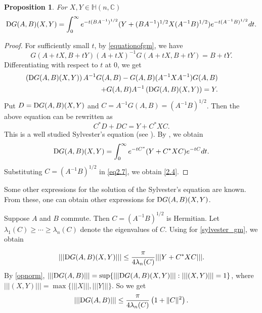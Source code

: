 \documentclass[12pt,epsfig,reqno]{amsart}
\newcommand{\C}{\mathbb{C}}
\newcommand{\De}{{\rm D}}
\newtheorem{prop}[thm]{Proposition}
\theoremstyle{remark}
\begin{document}
\begin{prop}\label{prop2.1}
For $X,Y\in \mathbb H(n,\C)$
\begin{equation}
\De G(A,B)(X,Y)=\int_0^{\infty} e^{-t (BA^{-1})^{1/2}} (Y+(BA^{-1})^{1/2} X (A^{-1} B)^{1/2}) e^{-t(A^{-1} B)^{1/2}} dt. \label{2.4}
\end{equation}
\end{prop}
\begin{proof}
 For sufficiently small $t$, by \eqref{equationofgm}, we have
\begin{equation}
G(A+tX,B+tY) (A+tX)^{-1} G(A+tX,B+tY)=B+tY.\label{2.1}
\end{equation}
Differentiating with respect to $t$  at $0$, we get
\begin{eqnarray*}
&&\hspace{-1.3cm}\left(\De G(A,B) (X,Y)\right) A^{-1} G(A,B)-G(A,B)(A^{-1}XA^{-1})G(A,B)\\
&&+G(A,B) A^{-1} \left(\De G(A,B)(X,Y)\right)=Y.
\end{eqnarray*}
Put $D=\De G(A,B)(X,Y)$ and $C=A^{-1} G(A,B)=(A^{-1} B)^{1/2}$. Then the above equation can be rewritten as
\begin{equation}
C^* D+D C=Y+C^* X C.\label{sylvester_gm}
\end{equation}
This is a well studied Sylvester's equation (see \cite{bhatia_matrix_analysis, bhatia_rosenthal}). By \cite[Theorem VII.2.3]{bhatia_matrix_analysis}, we obtain
\begin{equation}
\De G(A,B)(X,Y)=\int_0^{\infty} e^{-t C^*} (Y+C^*XC)   e^{-t C} dt. \label{eq2.7}
\end{equation}
Substituting $C=(A^{-1}B)^{1/2}$ in \eqref{eq2.7}, we obtain \eqref{2.4}.
\end{proof}

Some other expressions for the solution of the Sylvester's equation \cite{ bhatia_matrix_analysis, bhatiauchiyama} are known. From these, one can obtain other expressions for $\De G(A,B)(X,Y)$.

Suppose $A$ and $B$ commute. Then $C=(A^{-1}B)^{1/2}$ is Hermitian.  Let $\lambda_1(C)\geq \cdots\geq \lambda_n(C)$ denote the eigenvalues of $C$. Using \cite[Theorem VII.2.15]{bhatia_matrix_analysis} for \eqref{sylvester_gm}, we obtain

$$|||\De G(A,B)(X,Y)|||\leq \frac{\pi}{4 \lambda_n(C)} |||Y+C^*XC|||.$$
By \eqref{opnorm}, $|||\De G(A,B)|||=\sup\{|||\mathcal \De G(A,B)(X,Y)|||: |||(X,Y)|||=1\}$, where $|||(X,Y)|||= \max \{|||X|||,|||Y|||\}$. So we get
\begin{equation}
|||\De G(A,B)|||\leq \frac{\pi}{4 \lambda_n(C)} \left(1+\|C\|^2\right).\label{eq2.8}
\end{equation}
\end{document}
